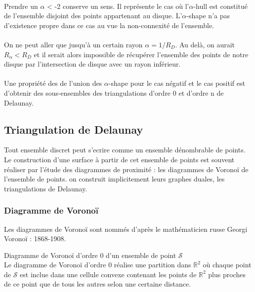 \paragraph{}
Prendre un $\alpha$ < -2 conserve un sens. Il représente le cas où l'$\alpha$-hull est constitué de l'ensemble disjoint des points appartenant au disque. L'$\alpha$-shape n'a pas d'existence propre dans ce cas au vue la non-connexité de l'ensemble.

\paragraph{}
On ne peut aller que jusqu'à un certain rayon $\alpha = 1/R_D$. Au delà, on aurait $R_{\alpha} < R_D$ et il serait alors impossible de récupérer l'ensemble des points de notre disque par l'intersection de disque avec un rayon inférieur.

\paragraph{}
Une propriété \cite{EdeKirSei83} des de l'union des $\alpha$-shape pour le cas négatif et le cas positif est d'obtenir des sous-ensembles des triangulations d'ordre 0 et d'ordre n de Delaunay.  

\subsection{Triangulation de Delaunay}

Tout ensemble discret peut s'ecrire comme un ensemble dénombrable de points. Le construction d'une surface à partir de cet ensemble de points est souvent réaliser par l'étude des diagrammes de proximité : les diagrammes de Voronoï de l'ensemble de points. on construit implicitement leurs graphes duales, les triangulations de Delaunay.


\subsubsection{Diagramme de Voronoï}

Les diagrammes de Voronoï sont nommés d'après le mathématicien russe Georgi Voronoï : 1868-1908.

\begin{Definition}{Diagramme de Voronoï d'ordre 0 d'un ensemble de point $\mathcal{S}$}\\
\label{def:tri-vor-0}
  Le diagramme de Voronoï d'ordre 0 réalise une partition dans $\mathbb{R}^2$ où chaque point de $\mathcal{S}$ est inclue dans une cellule convexe contenant les points de $\mathbb{R}^2$ plus proches de ce point que de tous les autres selon une certaine distance.
\end{Definition}

